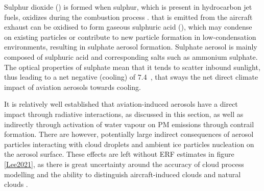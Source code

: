 Sulphur dioxide () is formed when sulphur, which is present in hydrocarbon jet fuels, oxidizes during the combustion process \cite{Brown1996}.  that is emitted from the aircraft exhaust can be oxidised to form gaseous sulphuric acid (), which may condense on existing particles or contribute to new particle formation in low-condensation environments, resulting in sulphate aerosol formation. Sulphate aerosol is mainly composed of sulphuric acid and corresponding salts such as ammonium sulphate. The optical properties of sulphate mean that it tends to scatter inbound sunlight, thus leading to a net negative (cooling) of 7.4~, that sways the net direct climate impact of aviation aerosols towards cooling. 

It is relatively well established that aviation-induced aerosols have a direct impact through radiative interactions, as discussed in this section, as well as indirectly through activation of water vapour on PM emissions through contrail formation. There are however, potentially large indirect consequences of aerosol particles interacting with cloud droplets and ambient ice particles nucleation on the aerosol surface. These effects are left without ERF estimates in figure \ref{Lee2021}, as there is great uncertainty around the accuracy of cloud process modelling and the ability to distinguish aircraft-induced clouds and natural clouds \cite{Penner2018}.

